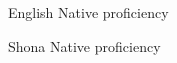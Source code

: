 
\begin{cvskills}

  \cvskill
    {English} %
    {Native proficiency} %

  \cvskill
    {Shona} %
    {Native proficiency} %

\end{cvskills}
